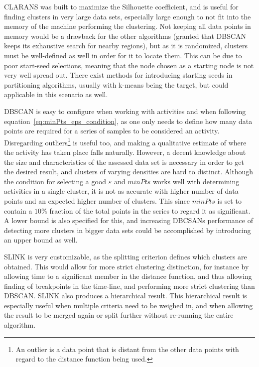 CLARANS was built to maximize the Silhouette coefficient, and is useful for
finding clusters in very large data sets, especially large enough to not 
fit into the memory of the machine performing the clustering. Not keeping all
data points in memory would be a drawback for the other algorithms (granted 
that DBSCAN keeps its exhaustive search for nearby regions), but as it is 
randomized, clusters must be well-defined as well in order for it to locate 
them. This can be due to poor start-seed selections, meaning that the node 
chosen as a starting node is not very well spread out.
There exist methods for introducing starting seeds in partitioning
algorithms, usually with k-means being the target, but could applicable in 
this scenario as well. 

DBSCAN is easy to configure when working with activities and when following
equation~\ref{eq:minPts_eps_condition}, as one only needs to define 
how many data points are required for a series of samples to be considered
an activity. Disregarding outliers\footnote{
    An outlier is a data point that is distant from the other data points
    with regard to the distance function being used.
} is useful too, and making a qualitative
estimate of where the activity has taken place falls naturally. 
However, a decent knowledge about the size and characteristics of the 
assessed data set is necessary in order to get the desired result, and
clusters of varying densities are hard to distinct.  
Although the condition for selecting a good $\varepsilon$ and $minPts$ works
well with determining activities in a single cluster, it is not as 
accurate with higher number of data points and an expected higher number
of clusters. This since $minPts$ is set to contain a $10\%$ fraction of the total
points in the series to regard it as significant. A lower bound is also 
specified for this, and increasing DBCSANs performance of detecting more
clusters in bigger data sets could be accomplished by introducing an 
upper bound as well. 

SLINK is very customizable, as the splitting criterion defines which 
clusters are obtained. This would allow for more strict clustering
distinction, for instance by allowing time to a significant member in the 
distance function, and thus allowing finding of breakpoints in the time-line, 
and performing more strict clustering than DBSCAN.
SLINK also produces a hierarchical result. 
This hierarchical result is especially useful when multiple criteria 
need to be weighed in, and when allowing the result to be merged again or
split further without re-running the entire algorithm. 

